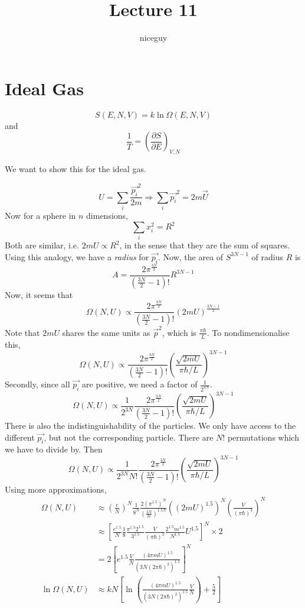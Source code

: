\documentclass[12pt]{article}
\author{niceguy}
\title{Lecture 11}
\begin{document}
\maketitle

\section{Ideal Gas}

$$S(E,N,V) = k\ln\Omega(E,N,V)$$
and
$$\frac{1}{T} = \left(\frac{\partial S}{\partial E}\right)_{V,N}$$

We want to show this for the ideal gas.

$$U = \sum_i \frac{\vec{p_i}^2}{2m} \Rightarrow \sum_i \vec{p_i}^2 = 2m\vec U$$
Now for a sphere in $n$ dimensions,
$$\sum_i x_i^2 = R^2$$
Both are similar, i.e. $2mU \propto R^2$, in the sense that they are the sum of squares. Using this analogy, we have a \textit{radius} for $\vec{p_i}$. Now, the area of $S^{3N-1}$ of radius $R$ is
$$A = \frac{2\pi^{\frac{3N}{2}}}{\left(\frac{3N}{2}-1\right)!} R^{3N-1}$$
Now, it seems that
$$\Omega(N,U) \propto \frac{2\pi^{\frac{3N}{2}}}{\left(\frac{3N}{2}-1\right)!}(2mU)^{\frac{3N-1}{2}}$$
Note that $2mU$ shares the same units as $\vec p^2$, which is $\frac{\pi\hbar}{L}$. To nondimensionalise this,
$$\Omega(N,U) \propto \frac{2\pi^{\frac{3N}{2}}}{\left(\frac{3N}{2}-1\right)!}\left(\frac{\sqrt{2mU}}{\pi\hbar/L}\right)^{3N-1}$$
Secondly, since all $\vec{p_i}$ are positive, we need a factor of $\frac{1}{2^{3N}}$.
$$\Omega(N,U) \propto \frac{1}{2^{3N}} \frac{2\pi^{\frac{3N}{2}}}{\left(\frac{3N}{2}-1\right)!}\left(\frac{\sqrt{2mU}}{\pi\hbar/L}\right)^{3N-1}$$
There is also the indistinguishability of the particles. We only have access to the different $\vec{p_i}$, but not the corresponding particle. There are $N!$ permutations which we have to divide by. Then
$$\Omega(N,U) \propto \frac{1}{2^{3N}N!} \frac{2\pi^{\frac{3N}{2}}}{\left(\frac{3N}{2}-1\right)!}\left(\frac{\sqrt{2mU}}{\pi\hbar/L}\right)^{3N-1}$$
Using more approximations,
\begin{align*}
	\Omega(N,U) &\approx \left(\frac{e}{N}\right)^N \frac{1}{8^N} \frac{2(\pi^{1.5})^N}{\left(\frac{3N}{2e}\right)^{1.5N}} ((2mU)^{1.5})^N \left(\frac{V}{(\pi\hbar)^3}\right)^N \\
		    &\approx \left[\frac{e^{1.5}}{N}\frac{1}{8}\frac{\pi^{1.5}2^{1.5}}{3^{1.5}} \frac{V}{(\pi\hbar)^3} \frac{2^{1.5}m^{1.5}}{N^{1.5}}U^{1.5} \right]^N \times 2 \\
		    &= 2\left[e^{1.5}\frac{V}{N} \frac{(4\pi mU)^{1.5}}{(3N(2\pi\hbar)^2)^{1.5}}\right]^N \\
	\ln\Omega(N,U) &\approx kN\left[\ln\left(\frac{(4\pi mU)^{1.5}}{(3N(2\pi\hbar)^2)^{1.5}}\frac{V}{N}\right) + \frac{5}{2}\right]
\end{align*}
\end{document}
